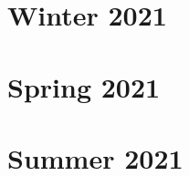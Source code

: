 \documentclass[hidelinks, 12pt]{article} %
\begin{document}
\newpage
\section{Winter 2021}
\label{Winter2021.tex}

\pagebreak
\newpage
\section{Spring 2021}
\label{Spring2021}

\pagebreak
\newpage
\section{Summer 2021}
\label{Summer2021}

\pagebreak

% 

% 

% 
\end{document}
